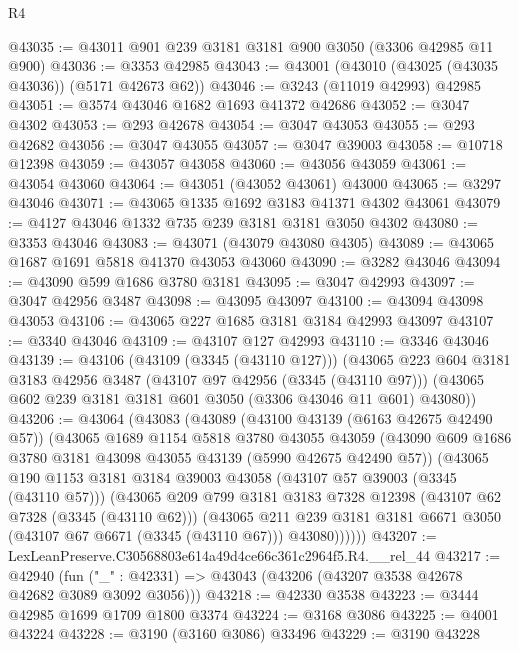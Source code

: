 \begin{lexlean}{R4}
\begin{coremodule}
@43035 := @43011 @901 @239 @3181 @3181 @900 @3050 (@3306 @42985 @11 @900)
@43036 := @3353 @42985
@43043 := @43001 (@43010 (@43025 (@43035 @43036)) (@5171 @42673 @62))
@43046 := @3243 (@11019 @42993) @42985
@43051 := @3574 @43046 @1682 @1693 @41372 @42686
@43052 := @3047 @4302
@43053 := @293 @42678
@43054 := @3047 @43053
@43055 := @293 @42682
@43056 := @3047 @43055
@43057 := @3047 @39003
@43058 := @10718 @12398
@43059 := @43057 @43058
@43060 := @43056 @43059
@43061 := @43054 @43060
@43064 := @43051 (@43052 @43061) @43000
@43065 := @3297 @43046
@43071 := @43065 @1335 @1692 @3183 @41371 @4302 @43061
@43079 := @4127 @43046 @1332 @735 @239 @3181 @3181 @3050 @4302
@43080 := @3353 @43046
@43083 := @43071 (@43079 @43080 @4305)
@43089 := @43065 @1687 @1691 @5818 @41370 @43053 @43060
@43090 := @3282 @43046
@43094 := @43090 @599 @1686 @3780 @3181
@43095 := @3047 @42993
@43097 := @3047 @42956 @3487
@43098 := @43095 @43097
@43100 := @43094 @43098 @43053
@43106 := @43065 @227 @1685 @3181 @3184 @42993 @43097
@43107 := @3340 @43046
@43109 := @43107 @127 @42993
@43110 := @3346 @43046
@43139 := @43106
    (@43109 (@3345 (@43110 @127)))
    (@43065
      @223
      @604
      @3181
      @3183
      @42956
      @3487
      (@43107 @97 @42956 (@3345 (@43110 @97)))
      (@43065 @602 @239 @3181 @3181 @601 @3050 (@3306 @43046 @11 @601) @43080))
@43206 := @43064
    (@43083
      (@43089
        (@43100 @43139 (@6163 @42675 @42490 @57))
        (@43065
          @1689
          @1154
          @5818
          @3780
          @43055
          @43059
          (@43090 @609 @1686 @3780 @3181 @43098 @43055 @43139 (@5990 @42675 @42490 @57))
          (@43065
            @190
            @1153
            @3181
            @3184
            @39003
            @43058
            (@43107 @57 @39003 (@3345 (@43110 @57)))
            (@43065
              @209
              @799
              @3181
              @3183
              @7328
              @12398
              (@43107 @62 @7328 (@3345 (@43110 @62)))
              (@43065
                @211
                @239
                @3181
                @3181
                @6671
                @3050
                (@43107 @67 @6671 (@3345 (@43110 @67)))
                @43080))))))
@43207 := LexLeanPreserve.C30568803e614a49d4ce66c361c2964f5.R4.__rel_44
@43217 := @42940
    (fun ("_" : @42331) => @43043 (@43206 (@43207 @3538 @42678 @42682 @3089 @3092 @3056)))
@43218 := @42330 @3538
@43223 := @3444 @42985 @1699 @1709 @1800 @3374
@43224 := @3168 @3086
@43225 := @4001 @43224
@43228 := @3190 (@3160 @3086) @33496
@43229 := @3190 @43228

\end{coremodule}
\end{lexlean}

